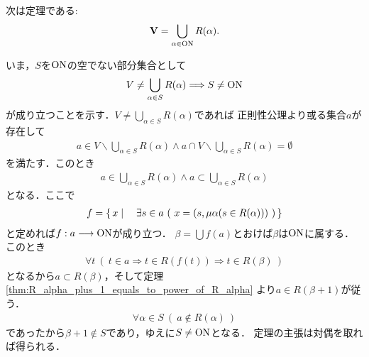 	\begin{screen}
		\begin{thm}[すべての集合は整礎的である]\label{thm:every_set_is_well_founded}
			次は定理である:
			\begin{align}
				\mathbf{V} = \bigcup_{\alpha \in \mathrm{ON}} R(\alpha).
			\end{align}
		\end{thm}
	\end{screen}
	
	\begin{prf}
		いま，$S$を$\mathrm{ON}$の空でない部分集合として
		\begin{align}
			V \neq \bigcup_{\alpha \in S} R(\alpha)
			\Longrightarrow S \neq \mathrm{ON}
		\end{align}
		が成り立つことを示す．$V \neq \bigcup_{\alpha \in S} R(\alpha)$であれば
		正則性公理より或る集合$a$が存在して
		\begin{align}
			a \in V \backslash \bigcup_{\alpha \in S} R(\alpha)
			\wedge a \cap V \backslash \bigcup_{\alpha \in S} R(\alpha) = \emptyset
		\end{align}
		を満たす．このとき
		\begin{align}
			a \in \bigcup_{\alpha \in S} R(\alpha) \wedge a \subset \bigcup_{\alpha \in S} R(\alpha)
		\end{align}
		となる．ここで
		\begin{align}
			f = \left\{\, x \mid \quad \exists s \in a\ (\ x = (s,\mu \alpha (s \in R(\alpha)))\ )\, \right\}
		\end{align}
		と定めれば$f:a \longrightarrow \mathrm{ON}$が成り立つ．
		$\beta = \bigcup f(a)$とおけば$\beta$は$\mathrm{ON}$に属する．このとき
		\begin{align}
			\forall t\ (\ t \in a \Longrightarrow t \in R(f(t))
			\Longrightarrow t \in R(\beta)\ )
		\end{align}
		となるから$a \subset R(\beta)$，そして定理\ref{thm:R_alpha_plus_1_equals_to_power_of_R_alpha}
		より$a \in R(\beta + 1)$が従う．
		\begin{align}
			\forall \alpha \in S\ (\ a \notin R(\alpha)\ )
		\end{align}
		であったから$\beta + 1 \notin S$であり，ゆえに$S \neq \mathrm{ON}$となる．
		定理の主張は対偶を取れば得られる．
		\QED
	\end{prf}
	
